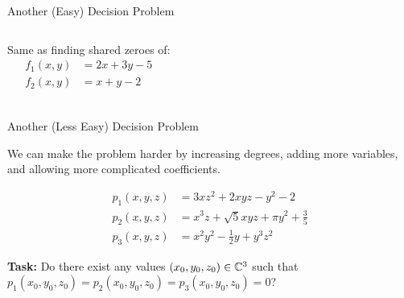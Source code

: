 \documentclass[c]{beamer}
\begin{document}
\begin{frame}{Another (Easy) Decision Problem}
  
  \begin{columns}
    
    Same as finding shared zeroes of:
    \begin{align*}
      f_1(x,y) &= 2x + 3y - 5\\
      f_2(x,y) &= x + y - 2\\
    \end{align*}


    \begin{center}
    \end{center}
  \end{columns}
\end{frame}

\begin{frame}{Another (Less Easy) Decision Problem}
 
  We can make the problem harder by increasing degrees, adding more
  variables, and allowing more complicated coefficients.
  
  \vspace{-\baselineskip}

  \begin{align*}
    p_1(x, y, z) &= 3xz^2 + 2xyz - y^2 - 2\\
    p_2(x, y, z) &= x^3z + \sqrt{5}xyz + \pi y^2 + \frac{3}{5}\\
    p_3(x, y, z) &= x^2y^2 - \frac{1}{2}y + y^3z^2
  \end{align*}\pause
  
  \textbf{Task:} Do there exist any values $(x_0, y_0, z_0) \in
  \mathbb{C}^3$ such that $p_1(x_0, y_0, z_0) = p_2(x_0, y_0, z_0) =
  p_3(x_0, y_0, z_0) = 0$?
  
\end{frame}

  
\end{document}
